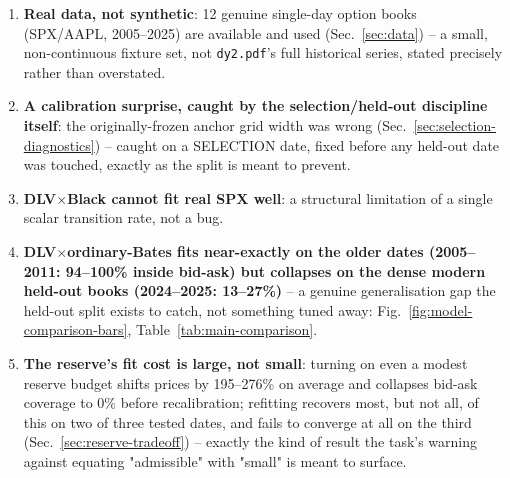 \documentclass[11pt]{article}
\begin{document}
\begin{enumerate}
\item \textbf{Real data, not synthetic}: 12 genuine single-day option
  books (SPX/AAPL, 2005--2025) are available and used
  (Sec.~\ref{sec:data}) -- a small, non-continuous fixture set, not
  \texttt{dy2.pdf}'s full historical series, stated precisely rather than
  overstated.
\item \textbf{A calibration surprise, caught by the selection/held-out
  discipline itself}: the originally-frozen anchor grid width was wrong
  (Sec.~\ref{sec:selection-diagnostics}) -- caught on a SELECTION date, fixed
  before any held-out date was touched, exactly as the split is meant to
  prevent.
\item \textbf{DLV$\times$Black cannot fit real SPX well}: a structural
  limitation of a single scalar transition rate, not a bug.
\item \textbf{DLV$\times$ordinary-Bates fits near-exactly on the older
  dates (2005--2011: 94--100\% inside bid-ask) but collapses on the dense
  modern held-out books (2024--2025: 13--27\%)} -- a genuine
  generalisation gap the held-out split exists to catch, not something
  tuned away: Fig.~\ref{fig:model-comparison-bars},
  Table~\ref{tab:main-comparison}.
\item \textbf{The reserve's fit cost is large, not small}: turning on even
  a modest reserve budget shifts prices by 195--276\% on average and
  collapses bid-ask coverage to 0\% before recalibration; refitting
  recovers most, but not all, of this on two of three tested dates, and
  fails to converge at all on the third (Sec.~\ref{sec:reserve-tradeoff}) --
  exactly the kind of result the task's warning against equating
  "admissible" with "small" is meant to surface.
\end{enumerate}






\end{document}
